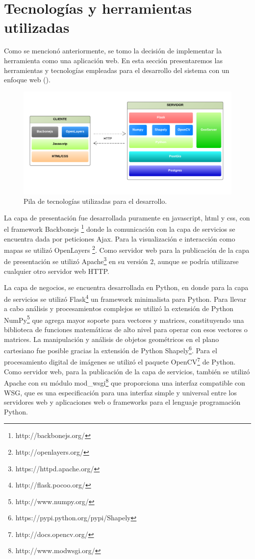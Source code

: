 \section{Tecnologías y herramientas utilizadas}
Como se mencionó anteriormente, se tomo la decisión de implementar la herramienta como una
aplicación web. En esta sección presentaremos las herramientas y tecnologías empleadas para el
desarrollo del sistema con un enfoque web ().

\begin{figure}[!htpb]
\centering
\includegraphics[width=1\textwidth]{capitulo-5/graphics/stack-tecnologias.png}
\caption{\label{fig:stack-tecnologias}Pila de tecnologías utilizadas para el desarrollo.}
\end{figure}

La capa de presentación fue desarrollada puramente en javascript, html y css, con el framework
Backbonejs \footnote{http://backbonejs.org/} donde la comunicación con la capa de servicios se
encuentra dada por peticiones Ajax. Para la visualización e interacción como mapas se utilizó
OpenLayers \footnote{http://openlayers.org/}. Como servidor web para la publicación de la capa de
presentación se utilizó Apache\footnote{https://httpd.apache.org/} en su versión 2, aunque se
podría utilizarse cualquier otro servidor web HTTP.

La capa de negocios, se encuentra desarrollada en Python, en donde para la capa de servicios se
utilizó Flask\footnote{http://flask.pocoo.org/} un framework minimalista para Python. Para llevar
a cabo análisis y procesamientos complejos se utilizó la extensión de Python NumPy\footnote{
http://www.numpy.org/} que agrega mayor soporte para vectores y matrices, constituyendo una
biblioteca de funciones matemáticas de alto nivel para operar con esos vectores o matrices.
La manipulación y análisis de objetos geométricos en el plano cartesiano fue posible gracias la
extensión de Python Shapely\footnote{https://pypi.python.org/pypi/Shapely}. Para el procesamiento
digital de imágenes se utilizó el paquete OpenCV\footnote{http://docs.opencv.org/}
de Python. Como servidor web, para la publicación de la capa de servicios, también se utilizó
Apache con su módulo mod\_wsgi\footnote{http://www.modwsgi.org/} que proporciona una interfaz
compatible con WSG, que es una especificación para una interfaz simple y universal entre los
servidores web y aplicaciones web o frameworks para el lenguaje programación Python.

